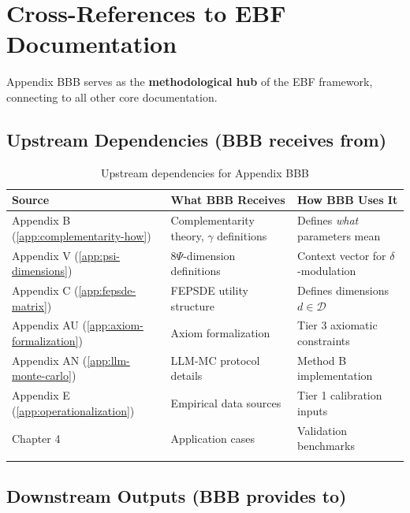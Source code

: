 \documentclass[11pt,a4paper]{article}
\theoremstyle{definition}
\begin{document}

\section{Cross-References to EBF Documentation}
\label{sec:bbb-crossref-expanded}

Appendix BBB serves as the \textbf{methodological hub} of the EBF framework, 
connecting to all other core documentation.

\subsection{Upstream Dependencies (BBB receives from)}

\begin{longtable}{lp{4cm}p{6cm}}
\toprule
\textbf{Source} & \textbf{What BBB Receives} & \textbf{How BBB Uses It} \\
\midrule
\endfirsthead
Appendix B (\ref{app:complementarity-how}) & Complementarity theory, $\gamma$ definitions & Defines \textit{what} parameters mean \\
Appendix V (\ref{app:psi-dimensions}) & 8$\Psi$-dimension definitions & Context vector for $\delta$-modulation \\
Appendix C (\ref{app:fepsde-matrix}) & FEPSDE utility structure & Defines dimensions $d \in \mathcal{D}$ \\
Appendix AU (\ref{app:axiom-formalization}) & Axiom formalization & Tier 3 axiomatic constraints \\
Appendix AN (\ref{app:llm-monte-carlo}) & LLM-MC protocol details & Method B implementation \\
Appendix E (\ref{app:operationalization}) & Empirical data sources & Tier 1 calibration inputs \\
Chapter 4 & Application cases & Validation benchmarks \\
\bottomrule
\caption{Upstream dependencies for Appendix BBB}
\end{longtable}

\subsection{Downstream Outputs (BBB provides to)}
\end{document}
